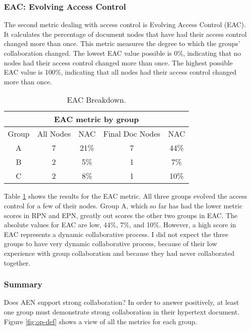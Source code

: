 \subsubsection{EAC: Evolving Access Control}

The second metric dealing with access control is Evolving Access Control
(EAC). It calculates the percentage of document nodes that have had their
access control changed more than once. This metric measures the degree to
which the groups' collaboration changed. The lowest EAC value possible is
0\%, indicating that no nodes had their access control changed more than
once.  The highest possible EAC value is 100\%, indicating that all nodes
had their access control changed more than once.

\small
\begin{table}[htb]
  \caption{EAC Breakdown.}
  \begin{center}
    \begin{tabular}{|c|c|c||c|c|}
      \hline
      \multicolumn{5}{|c|}{\rule[-3mm]{0mm}{8mm}\bf EAC metric by group}\\ 
      \hline
      Group&All Nodes&NAC&Final Doc Nodes&NAC\\ \hline
      \hline
      A&7&21\%&7&44\%\\ \hline
      B&2&5\%&1&7\%\\ \hline
      C&2&8\%&1&10\%\\ \hline
    \end{tabular}
  \end{center}
  \label{tab:d-access-control}
\end{table}
\normalsize

Table \ref{tab:d-access-control} shows the results for the EAC metric.  All
three groups evolved the access control for a few of their nodes.  Group
A, which so far has had the lower metric scores in RPN and EPN, greatly
out scores the other two groups in EAC.  The absolute values for EAC are
low, 44\%, 7\%, and 10\%.  However, a high score in EAC represents a
dynamic collaborative process.  I did not expect the three groups to have
very dynamic collaborative process, because of their low experience with
group collaboration and because they had never collaborated together.

\subsubsection{Summary}


Does AEN support strong collaboration?  In order to answer positively, at
least one group must demonstrate strong collaboration in their hypertext
document. Figure \ref{fig:op-def} shows a view of all the metrics for each
group.

